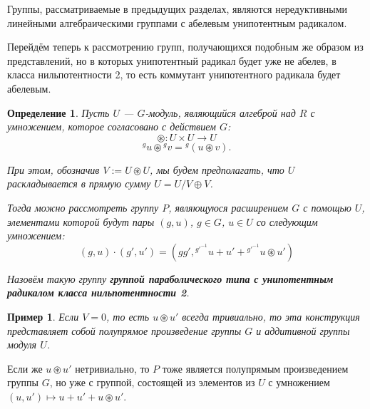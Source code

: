 \documentclass[12pt]{matmex-diploma}
\theoremstyle{mystyleni}
\theoremstyle{mystyle}
\newtheorem{example}{Пример}
\newtheorem{definition}{Определение}
\begin{document}
Группы, рассматриваемые в предыдущих разделах, являются нередуктивными линейными алгебраическими группами с абелевым унипотентным радикалом.

Перейдём теперь к рассмотрению групп, получающихся подобным же образом из представлений, но в которых унипотентный радикал будет уже не абелев, в класса нильпотентности 2, то есть коммутант унипотентного радикала будет абелевым.

\begin{framed}
\begin{definition}
Пусть $U$ --- $G$-модуль, являющийся алгеброй над $R$ с умножением, которое согласовано с действием $G$:
$$\circledast : U \times U \to U$$
$$ {}^g u \circledast {}^g v = {}^g (u \circledast v) .$$

При этом, обозначив $V:=U\circledast U$, мы будем предполагать, что $U$ раскладывается в прямую сумму $U = U\!/V \oplus V$.

Тогда можно рассмотреть группу $P$, являющуюся расширением $G$ с помощью $U$, элементами которой будут пары $(g,u)$, $g \in G$, $u \in U$ со следующим умножением:
$$
(g,u)\cdot (g',u') = (g g', {}^{g'^{-1}} u + u' + {}^{g'^{-1}} u \circledast u')
$$

Назовём такую группу \textit{\textbf{группой параболического типа с унипотентным радикалом класса нильпотентности 2}}.
\end{definition}
\end{framed}

\begin{example}
Если $V=0$, то есть $u \circledast u'$ всегда тривиально, то эта конструкция представляет собой полупрямое произведение группы $G$ и аддитивной группы модуля $U$.
\end{example}

Если же $u \circledast u'$ нетривиально, то $P$ тоже является полупрямым произведением группы $G$, но уже с группой, состоящей из элементов из $U$ с умножением
$
(u,u') \mapsto u + u' + u \circledast u'
$.
\end{document}

